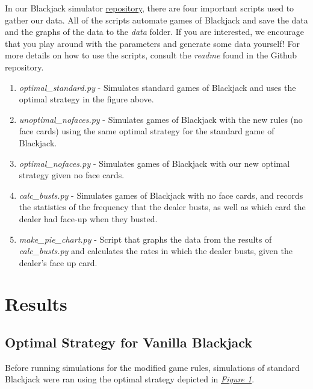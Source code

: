\documentclass{article}
\begin{document}
{		In our Blackjack simulator \href{https://github.com/hosua/blackjack-cs241}{repository}, there are four important scripts
		used to gather our data. All of the scripts automate games of Blackjack and save the data and the graphs of the data to the \textit{data} folder.
		If you are interested, we encourage that you play around with the parameters and generate some data yourself! For more details on how to use the scripts,
		consult the \textit{readme} found in the Github repository.
		\newpage 

		\begin{enumerate}
			\item \textit{optimal\_standard.py} - Simulates standard games of Blackjack and uses the optimal strategy in the figure above.
			\item \textit{unoptimal\_nofaces.py} - Simulates games of Blackjack with the new rules (no face cards) using the same optimal strategy for the standard game of Blackjack.
			\item \textit{optimal\_nofaces.py} - Simulates games of Blackjack with our new optimal strategy given no face cards.
			\item \textit{calc\_busts.py} - Simulates games of Blackjack with no face cards, and records the statistics of the frequency that the dealer busts, as well as which card the dealer 
				had face-up when they busted.
			\item \textit{make\_pie\_chart.py} - Script that graphs the data from the results of \textit{calc\_busts.py} and calculates
				the rates in which the dealer busts, given the dealer's face up card.
		\end{enumerate}

\vspace{0.5cm}
		
\section{Results}
\label{sec: Results}

    \subsection{Optimal Strategy for Vanilla Blackjack}
	\label{Optimal Strategy for Vanilla Blackjack}
		
		Before running simulations for the modified game rules, simulations of standard Blackjack were ran using the optimal strategy depicted in \hyperlink{fig1}{\textit{Figure 1}}.
		
}
\end{document}
